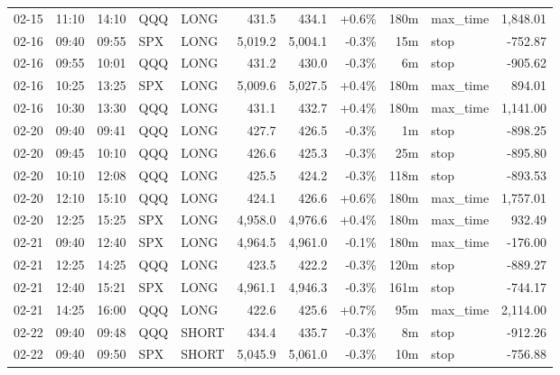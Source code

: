 \documentclass[11pt,a4paper,twoside]{article}
\begin{document}
\begin{center}
\begin{longtable}{>{\color{txtmain}}l l l l l r r r r >{\color{txtmain}}l r}
02-15 & 11:10 & 14:10 & QQQ & LONG & 431.5 & 434.1 & \textcolor{wingreen}{+0.6\%} & 180m & max\_time & \textcolor{wingreen}{1,848.01} \\
02-16 & 09:40 & 09:55 & SPX & LONG & 5,019.2 & 5,004.1 & \textcolor{lossred}{-0.3\%} & 15m & stop & \textcolor{lossred}{-752.87} \\
02-16 & 09:55 & 10:01 & QQQ & LONG & 431.2 & 430.0 & \textcolor{lossred}{-0.3\%} & 6m & stop & \textcolor{lossred}{-905.62} \\
02-16 & 10:25 & 13:25 & SPX & LONG & 5,009.6 & 5,027.5 & \textcolor{wingreen}{+0.4\%} & 180m & max\_time & \textcolor{wingreen}{894.01} \\
02-16 & 10:30 & 13:30 & QQQ & LONG & 431.1 & 432.7 & \textcolor{wingreen}{+0.4\%} & 180m & max\_time & \textcolor{wingreen}{1,141.00} \\
02-20 & 09:40 & 09:41 & QQQ & LONG & 427.7 & 426.5 & \textcolor{lossred}{-0.3\%} & 1m & stop & \textcolor{lossred}{-898.25} \\
02-20 & 09:45 & 10:10 & QQQ & LONG & 426.6 & 425.3 & \textcolor{lossred}{-0.3\%} & 25m & stop & \textcolor{lossred}{-895.80} \\
02-20 & 10:10 & 12:08 & QQQ & LONG & 425.5 & 424.2 & \textcolor{lossred}{-0.3\%} & 118m & stop & \textcolor{lossred}{-893.53} \\
02-20 & 12:10 & 15:10 & QQQ & LONG & 424.1 & 426.6 & \textcolor{wingreen}{+0.6\%} & 180m & max\_time & \textcolor{wingreen}{1,757.01} \\
02-20 & 12:25 & 15:25 & SPX & LONG & 4,958.0 & 4,976.6 & \textcolor{wingreen}{+0.4\%} & 180m & max\_time & \textcolor{wingreen}{932.49} \\
02-21 & 09:40 & 12:40 & SPX & LONG & 4,964.5 & 4,961.0 & \textcolor{lossred}{-0.1\%} & 180m & max\_time & \textcolor{lossred}{-176.00} \\
02-21 & 12:25 & 14:25 & QQQ & LONG & 423.5 & 422.2 & \textcolor{lossred}{-0.3\%} & 120m & stop & \textcolor{lossred}{-889.27} \\
02-21 & 12:40 & 15:21 & SPX & LONG & 4,961.1 & 4,946.3 & \textcolor{lossred}{-0.3\%} & 161m & stop & \textcolor{lossred}{-744.17} \\
02-21 & 14:25 & 16:00 & QQQ & LONG & 422.6 & 425.6 & \textcolor{wingreen}{+0.7\%} & 95m & max\_time & \textcolor{wingreen}{2,114.00} \\
02-22 & 09:40 & 09:48 & QQQ & SHORT & 434.4 & 435.7 & \textcolor{lossred}{-0.3\%} & 8m & stop & \textcolor{lossred}{-912.26} \\
02-22 & 09:40 & 09:50 & SPX & SHORT & 5,045.9 & 5,061.0 & \textcolor{lossred}{-0.3\%} & 10m & stop & \textcolor{lossred}{-756.88} \\

\end{longtable}
\end{center}
\end{document}

